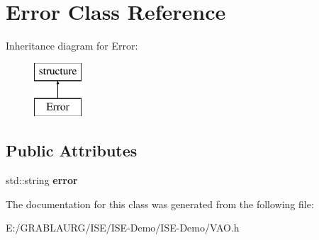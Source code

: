 \hypertarget{class_error}{\section{Error Class Reference}
\label{class_error}
}
Inheritance diagram for Error\-:\begin{figure}[H]
\begin{center}
\leavevmode
\includegraphics[height=2.000000cm]{class_error}
\end{center}
\end{figure}
\subsection*{Public Attributes}
\begin{DoxyCompactItemize}
\item 
\hypertarget{class_error_a7ca1958fd4898587d70b88c0c0dc0695}{std\-::string {\bfseries error}}\label{class_error_a7ca1958fd4898587d70b88c0c0dc0695}

\end{DoxyCompactItemize}


The documentation for this class was generated from the following file\-:\begin{DoxyCompactItemize}
\item 
E\-:/\-G\-R\-A\-B\-L\-A\-U\-R\-G/\-I\-S\-E/\-I\-S\-E-\/\-Demo/\-I\-S\-E-\/\-Demo/V\-A\-O.\-h\end{DoxyCompactItemize}
